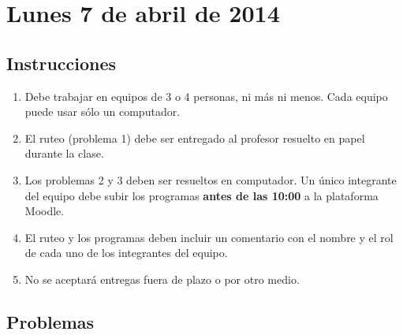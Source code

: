 \documentclass[11pt,spanish]{article}
\begin{document}
  \thispagestyle{empty}
  \pagestyle{empty}
  \section*{Lunes 7 de abril de 2014}

  \subsection*{Instrucciones}

  \begin{enumerate}[leftmargin=0pt,label=\emph{\alph*})]

    \item
      Debe trabajar en equipos de 3 o 4 personas, ni más ni menos.
      Cada equipo puede usar sólo un computador.
    \item
      El ruteo (problema 1) debe ser entregado al profesor
      resuelto en papel durante la clase.
    \item
      Los problemas 2 y 3 deben ser resueltos en computador.
      Un único integrante del equipo debe subir los programas
      \textbf{antes de las 10:00} a la plataforma Moodle.
    \item
      El ruteo y los programas deben incluir un comentario
      con el nombre y el rol de cada uno
      de los integrantes del equipo.
    \item
      No se aceptará entregas fuera de plazo o por otro medio.

  \end{enumerate}

  \subsection*{Problemas}

  \begin{certamen}
    \item
      
      \newpage
    \item
      
      \vspace{3ex}
    \item
      
  \end{certamen}
\end{document}
